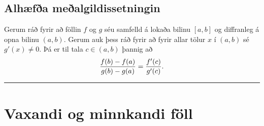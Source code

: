 \documentclass[a4paper,10pt,icelandic]{sphinxmanual}
\begin{document}
\subsection{Alhæfða meðalgildissetningin}
\label{kafli03:index-8}\label{kafli03:alhaefa-mealgildissetningin}
Gerum ráð fyrir að föllin \(f\) og \(g\) séu samfelld á lokaða
bilinu \([a,b]\) og diffranleg á opna bilinu \((a,b)\). Gerum
auk þess ráð fyrir að fyrir allar tölur \(x\) í \((a,b)\) sé
\(g'(x)\neq 0\). Þá er til tala \(c\in (a,b)\) þannig að
\begin{gather}
\begin{split}\frac{f(b)-f(a)}{g(b)-g(a)}=\frac{f'(c)}{g'(c)}.\end{split}\notag
\end{gather}

\bigskip\hrule{}\bigskip



\section{Vaxandi og minnkandi föll}
\label{kafli03:vaxandiminnkandi}\label{kafli03:vaxandi-og-minnkandi-foll}
\end{document}

